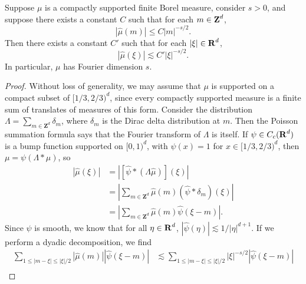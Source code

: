 \begin{lemma} \label{discretefouriermeasures}
    Suppose $\mu$ is a compactly supported finite Borel measure, consider $s > 0$, and suppose there exists a constant $C$ such that for each $m \in \operatorname{\mathbf{Z}}^d$,
    \begin{equation} \label{mufourierbound1}   
        |\widehat{\mu}(m)| \leq C |m|^{-s/2}.
    \end{equation} 
    Then there exists a constant $C'$ such that for each $|\xi| \in \operatorname{\mathbf{R}}^d$,
    \begin{equation} \label{mufourierbound2}
        |\widehat{\mu}(\xi)| \lesssim C' |\xi|^{-s/2}.
    \end{equation}
    In particular, $\mu$ has Fourier dimension $s$.
\end{lemma}
\begin{proof}
    Without loss of generality, we may assume that $\mu$ is supported on a compact subset of $[1/3,2/3)^d$, since every compactly supported measure is a finite sum of translates of measures of this form. Consider the distribution $\Lambda = \sum_{m \in \mathbf{Z}^d} \delta_m$, where $\delta_m$ is the Dirac delta distribution at $m$. Then the Poisson summation formula says that the Fourier transform of $\Lambda$ is itself. If $\psi \in C_c(\operatorname{\mathbf{R}}^d)$ is a bump function supported on $[0,1)^d$, with $\psi(x) = 1$ for $x \in [1/3,2/3)^d$, then $\mu = \psi (\Lambda * \mu)$, so
    \begin{equation} \label{mubounded}
    \begin{split}
        |\widehat{\mu}(\xi)| &= \left| \left[ \widehat{\psi} * (\Lambda \widehat{\mu}) \right](\xi) \right|\\
        &= \left| \sum_{m \in \mathbf{Z}^d} \widehat{\mu}(m)(\widehat{\psi} * \delta_m)(\xi) \right|\\
        &= \left| \sum_{m \in \mathbf{Z}^d} \widehat{\mu}(m) \widehat{\psi}(\xi - m) \right|.
    \end{split}
    \end{equation}
    Since $\psi$ is smooth, we know that for all $\eta \in \operatorname{\mathbf{R}}^d$, $|\widehat{\psi}(\eta)| \lesssim 1/|\eta|^{d+1}$. If we perform a dyadic decomposition, we find
    \begin{equation}
        \label{calculation1}
    \begin{split}
        \sum_{1 \leq |m - \xi| \leq |\xi|/2} |\widehat{\mu}(m)| |\widehat{\psi}(\xi - m)| &\lesssim \sum_{1 \leq |m - \xi| \leq |\xi|/2} |\xi|^{-s/2} |\widehat{\psi}(\xi - m)|\\

\end{split}
\end{equation}
\end{proof}
